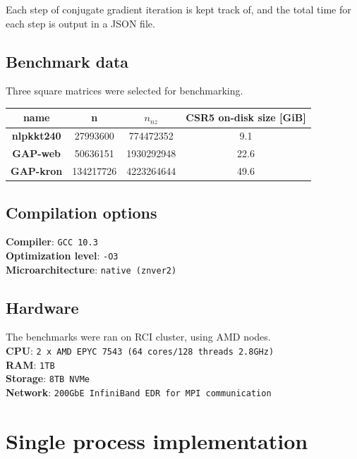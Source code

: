 \documentclass[thesis=M,english]{FITthesis}[2019/12/23]
\begin{document}
Each step of conjugate gradient iteration is kept track of, and the total time
for each step is output in a JSON file.

\subsection{Benchmark data}

Three square matrices were selected for benchmarking.

\begin{tabular}{|c|c|c|c|}
    \hline
    \textbf{name}      & \textbf{n} & $n_{nz}$   & \textbf{CSR5 on-disk size} [GiB] \\
    \hline
    \hline
    \textbf{nlpkkt240} & 27993600   & 774472352  & 9.1                              \\
    \hline
    \textbf{GAP-web}   & 50636151   & 1930292948 & 22.6                             \\
    \hline
    \textbf{GAP-kron}  & 134217726  & 4223264644 & 49.6                             \\
    \hline
\end{tabular}


\subsection{Compilation options}

\textbf{Compiler}: \texttt{GCC 10.3} \\
\textbf{Optimization level}: \texttt{-O3} \\
\textbf{Microarchitecture}: \texttt{native (znver2)} \\


\subsection{Hardware}

The benchmarks were ran on RCI cluster, using AMD nodes.\\
\textbf{CPU}: \texttt{2 x AMD EPYC 7543 (64 cores/128 threads 2.8GHz)} \\
\textbf{RAM}: \texttt{1TB}\\
\textbf{Storage}: \texttt{8TB NVMe} \\
\textbf{Network}: \texttt{200GbE InfiniBand EDR for MPI communication}


\section{Single process implementation}
\end{document}
